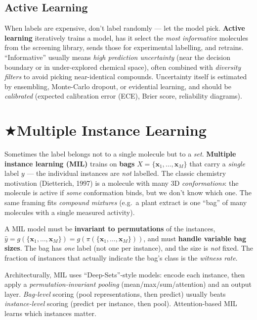 \documentclass[11pt, oneside]{book}
\makeatletter
\newcommand{\starglyph}{\textcolor{stargold}{\ensuremath{\bigstar}}}
\newcommand{\starsec}[1]{%
  \texorpdfstring{\starglyph\hspace{0.4em}\textcolor{star@frame}{#1}}{#1}}
\newcommand{\xvec}{\mathbf{x}}
\makeatother
\begin{document}
\subsection{Active Learning}

When labels are expensive, don't label randomly --- let the model pick.
\textbf{Active learning} iteratively trains a model, has it select the
\emph{most informative} molecules from the screening library, sends those for
experimental labelling, and retrains. ``Informative'' usually means \emph{high
prediction uncertainty} (near the decision boundary or in under-explored chemical
space), often combined with \emph{diversity filters} to avoid picking near-identical
compounds. Uncertainty itself is estimated by ensembling, Monte-Carlo dropout, or
evidential learning, and should be \emph{calibrated} (expected calibration error
(ECE), Brier score, reliability
diagrams).

\section{\starsec{Multiple Instance Learning}}

Sometimes the label belongs not to a single molecule but to a \emph{set}.
\textbf{Multiple instance learning (MIL)} trains on \textbf{bags}
$X=\{\xvec_1,\dots,\xvec_M\}$ that carry a \emph{single} label $y$ --- the
individual instances are \emph{not} labelled. The classic chemistry motivation
(Dietterich, 1997) is a molecule with many 3D \emph{conformations}: the molecule is
active if \emph{some} conformation binds, but we don't know which one. The same
framing fits \emph{compound mixtures} (e.g.\ a plant extract is one ``bag'' of many
molecules with a single measured activity).

\begin{notebox}[title={What MIL requires (and what it doesn't)}]
A MIL model must be \textbf{invariant to permutations} of the instances,
$\hat y = g(\{\xvec_1,\dots,\xvec_M\}) = g(\pi(\{\xvec_1,\dots,\xvec_M\}))$, and
must \textbf{handle variable bag sizes}. The bag has \emph{one} label (not one per
instance), and the size is \emph{not} fixed. The fraction of instances that
actually indicate the bag's class is the \emph{witness rate}.
\end{notebox}

Architecturally, MIL uses ``Deep-Sets''-style models: encode each instance, then
apply a \emph{permutation-invariant pooling} (mean/max/sum/attention) and an output
layer. \emph{Bag-level} scoring (pool representations, then predict) usually beats
\emph{instance-level} scoring (predict per instance, then pool). Attention-based MIL
learns which instances matter.
\end{document}
